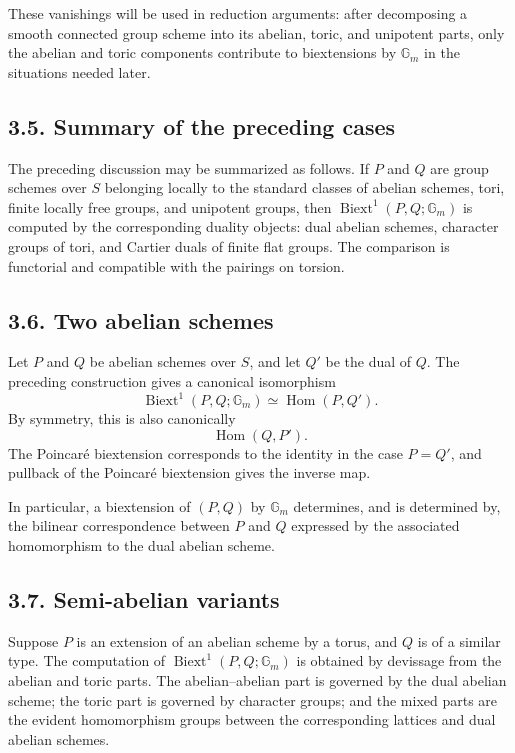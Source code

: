 \documentclass[11pt]{article}
\theoremstyle{plain}
\theoremstyle{definition}
\theoremstyle{remark}
\DeclareMathOperator{\Hom}{Hom}
\DeclareMathOperator{\Biext}{Biext}
\newcommand{\Gm}{\mathbb G_m}
\begin{document}
These vanishings will be used in reduction arguments: after decomposing a smooth
connected group scheme into its abelian, toric, and unipotent parts, only the
abelian and toric components contribute to biextensions by \(\Gm\) in the
situations needed later.

\subsection*{3.5. Summary of the preceding cases}

The preceding discussion may be summarized as follows. If \(P\) and \(Q\) are
group schemes over \(S\) belonging locally to the standard classes of abelian
schemes, tori, finite locally free groups, and unipotent groups, then
\(\Biext^1(P,Q;\Gm)\) is computed by the corresponding duality objects:
dual abelian schemes, character groups of tori, and Cartier duals of finite flat
groups. The comparison is functorial and compatible with the pairings on torsion.

\subsection*{3.6. Two abelian schemes}

Let \(P\) and \(Q\) be abelian schemes over \(S\), and let \(Q'\) be the dual of
\(Q\). The preceding construction gives a canonical isomorphism
\[
\Biext^1(P,Q;\Gm)\simeq \Hom(P,Q').
\]
By symmetry, this is also canonically
\[
\Hom(Q,P').
\]
The Poincaré biextension corresponds to the identity in the case \(P=Q'\), and
pullback of the Poincaré biextension gives the inverse map.

In particular, a biextension of \((P,Q)\) by \(\Gm\) determines, and is
determined by, the bilinear correspondence between \(P\) and \(Q\) expressed by
the associated homomorphism to the dual abelian scheme.

\subsection*{3.7. Semi-abelian variants}

Suppose \(P\) is an extension of an abelian scheme by a torus, and \(Q\) is of a
similar type. The computation of \(\Biext^1(P,Q;\Gm)\) is obtained by devissage
from the abelian and toric parts. The abelian--abelian part is governed by the
dual abelian scheme; the toric part is governed by character groups; and the
mixed parts are the evident homomorphism groups between the corresponding
lattices and dual abelian schemes.
\end{document}
